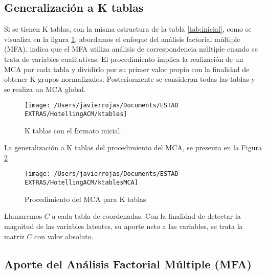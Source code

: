 \documentclass[water,article,submit,moreauthors,pdftex]{mdpi}
\begin{document}
\hypertarget{generalizaciuxf3n-a-k-tablas}{%
\subsection{Generalización a K
tablas}\label{generalizaciuxf3n-a-k-tablas}}

Si se tienen K tablas, con la misma estructura de la tabla
\ref{tab:inicial}, como se visualiza en la figura \ref{fig:ktables},
abordamos el enfoque del análisis factorial múltiple (MFA). \citet{AFM}
indica que el MFA utiliza análisis de correspondencia múltiple cuando se
trata de variables cualitativas. El procedimiento implica la realización
de un MCA por cada tabla y dividirlo por su primer valor propio con la
finalidad de obtener K grupos normalizados. Posteriormente se consideran
todas las tablas y se realiza un MCA global.

\begin{figure}[!ht]



\begin{center}\texttt{[image: /Users/javierrojas/Documents/ESTAD EXTRAS/HotellingACM/ktables]} \end{center}

\caption{K tablas con el formato inicial.}

\label{fig:ktables}
\end{figure}

La generalización a K tablas del procedimiento del MCA, se presenta en
la Figura \ref{fig:MCAk}

\begin{figure}[!h]


\begin{center}\texttt{[image: /Users/javierrojas/Documents/ESTAD EXTRAS/HotellingACM/ktablesMCA]} \end{center}

\caption{Procedimiento del MCA para K tablas}

\label{fig:MCAk}
\end{figure}

Llamaremos \(C\) a cada tabla de coordenadas. Con la finalidad de
detectar la magnitud de las variables latentes, su aporte neto a las
variables, se trata la matriz \(C\) con valor absoluto.

\hypertarget{aporte-del-anuxe1lisis-factorial-muxfaltiple-mfa}{%
\subsection{Aporte del Análisis Factorial Múltiple
(MFA)}\label{aporte-del-anuxe1lisis-factorial-muxfaltiple-mfa}}
\end{document}
